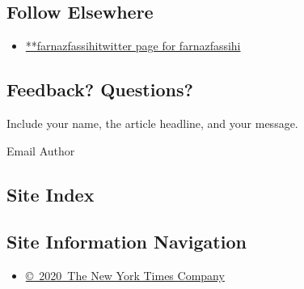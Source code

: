 \hypertarget{follow-elsewhere}{%
\subsection{Follow Elsewhere}\label{follow-elsewhere}}

\begin{itemize}
\tightlist
\item
  \href{https://twitter.com/farnazfassihi}{**farnazfassihitwitter page
  for farnazfassihi}
\end{itemize}

\hypertarget{feedback-questions}{%
\subsection{Feedback? Questions?}\label{feedback-questions}}

Include your name, the article headline, and your message.

Email Author

\hypertarget{site-index}{%
\subsection{Site Index}\label{site-index}}

\hypertarget{site-information-navigation}{%
\subsection{Site Information
Navigation}\label{site-information-navigation}}

\begin{itemize}
\tightlist
\item
  \href{https://help.nytimes.com/hc/en-us/articles/115014792127-Copyright-notice}{©~2020~The
  New York Times Company}
\end{itemize}

